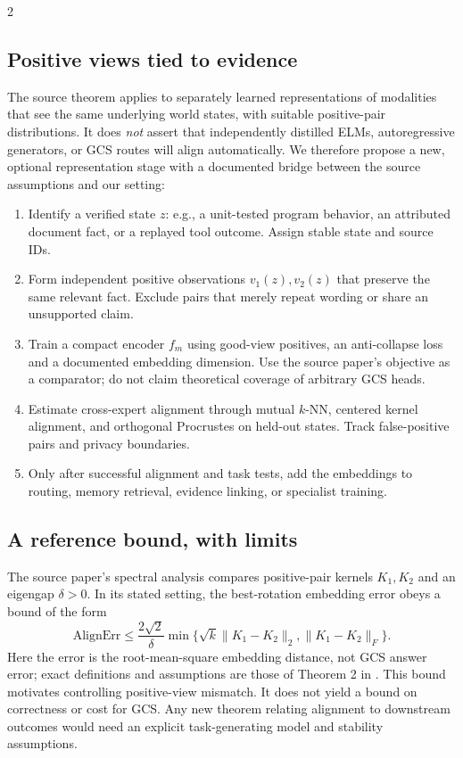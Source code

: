 \documentclass[10pt,letterpaper]{article}
\begin{document}
\begin{multicols}{2}
\subsection{Positive views tied to evidence}
The source theorem applies to separately learned representations of modalities that see the same underlying world states, with suitable positive-pair distributions. It does \emph{not} assert that independently distilled ELMs, autoregressive generators, or GCS routes will align automatically. We therefore propose a new, optional representation stage with a documented bridge between the source assumptions and our setting:
\begin{enumerate}
\item Identify a verified state $z$: e.g., a unit-tested program behavior, an attributed document fact, or a replayed tool outcome. Assign stable state and source IDs.
\item Form independent positive observations $v_1(z),v_2(z)$ that preserve the same relevant fact. Exclude pairs that merely repeat wording or share an unsupported claim.
\item Train a compact encoder $f_m$ using good-view positives, an anti-collapse loss and a documented embedding dimension. Use the source paper's objective as a comparator; do not claim theoretical coverage of arbitrary GCS heads.
\item Estimate cross-expert alignment through mutual $k$-NN, centered kernel alignment, and orthogonal Procrustes on held-out states. Track false-positive pairs and privacy boundaries.
\item Only after successful alignment and task tests, add the embeddings to routing, memory retrieval, evidence linking, or specialist training.
\end{enumerate}

\subsection{A reference bound, with limits}
The source paper's spectral analysis compares positive-pair kernels $K_1,K_2$ and an eigengap $\delta>0$. In its stated setting, the best-rotation embedding error obeys a bound of the form
\begin{equation}
\mathrm{AlignErr}\le\frac{2\sqrt2}{\delta}\min\{\sqrt{k}\lVert K_1-K_2\rVert_2,\lVert K_1-K_2\rVert_F\}.
\label{eq:kernel}
\end{equation}
Here the error is the root-mean-square embedding distance, not GCS answer error; exact definitions and assumptions are those of Theorem 2 in \cite{balestriero2026}. This bound motivates controlling positive-view mismatch. It does not yield a bound on correctness or cost for GCS. Any new theorem relating alignment to downstream outcomes would need an explicit task-generating model and stability assumptions.


\end{multicols}
\end{document}
